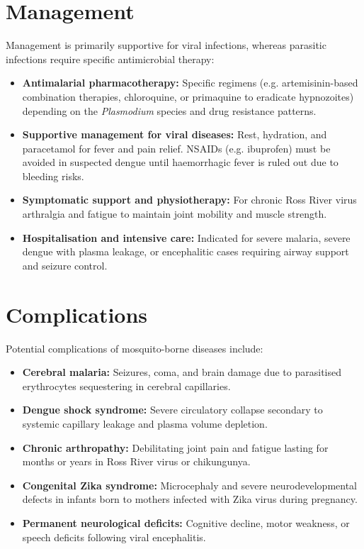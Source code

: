 \section*{Management}
Management is primarily supportive for viral infections, whereas parasitic infections require specific antimicrobial therapy:
\begin{itemize}
    \item \textbf{Antimalarial pharmacotherapy:} Specific regimens (e.g. artemisinin-based combination therapies, chloroquine, or primaquine to eradicate hypnozoites) depending on the \textit{Plasmodium} species and drug resistance patterns.
    \item \textbf{Supportive management for viral diseases:} Rest, hydration, and paracetamol for fever and pain relief. NSAIDs (e.g. ibuprofen) must be avoided in suspected dengue until haemorrhagic fever is ruled out due to bleeding risks.
    \item \textbf{Symptomatic support and physiotherapy:} For chronic Ross River virus arthralgia and fatigue to maintain joint mobility and muscle strength.
    \item \textbf{Hospitalisation and intensive care:} Indicated for severe malaria, severe dengue with plasma leakage, or encephalitic cases requiring airway support and seizure control.
\end{itemize}

\section*{Complications}
Potential complications of mosquito-borne diseases include:
\begin{itemize}
    \item \textbf{Cerebral malaria:} Seizures, coma, and brain damage due to parasitised erythrocytes sequestering in cerebral capillaries.
    \item \textbf{Dengue shock syndrome:} Severe circulatory collapse secondary to systemic capillary leakage and plasma volume depletion.
    \item \textbf{Chronic arthropathy:} Debilitating joint pain and fatigue lasting for months or years in Ross River virus or chikungunya.
    \item \textbf{Congenital Zika syndrome:} Microcephaly and severe neurodevelopmental defects in infants born to mothers infected with Zika virus during pregnancy.
    \item \textbf{Permanent neurological deficits:} Cognitive decline, motor weakness, or speech deficits following viral encephalitis.
\end{itemize}

